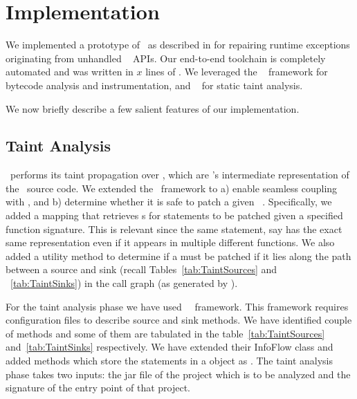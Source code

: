\section{Implementation}
\label{sec:implementation}

We implemented a prototype of \tool\ as described in  for
repairing runtime exceptions originating from unhandled \java\ 
APIs. Our end-to-end toolchain is completely automated and was written in $x$
lines of \java. We leveraged the \soot~\cite{} framework for bytecode analysis
and instrumentation, and \infoflow~\cite{} for static taint analysis.


We now briefly describe a few salient features of our implementation.

\subsection{Taint Analysis}

\infoflow\ performs its taint propagation over , which are \soot's
intermediate representation of the \java\ source code. We extended the
\infoflow\ framework to a) enable seamless coupling with \soot, and b) determine
whether it is safe to patch a given \soot\ . Specifically, we added
a mapping that retrieves s for statements to be patched given a
specified function signature. This is relevant since the same statement, say
 has the exact same representation even if it appears in
multiple different functions. We also added a utility method to determine if a
 must be patched if it lies along the path between a source and sink
(recall Tables~\ref{tab:TaintSources} and ~\ref{tab:TaintSinks}) in the call
graph (as generated by \soot).

 For the taint analysis phase we have used \soot\ \infoflow\ framework. This
 framework requires configuration files to describe source and sink methods. We
 have identified couple of methods and some of them are tabulated in the
 table~\ref{tab:TaintSources} and~\ref{tab:TaintSinks} respectively. We have
 extended their InfoFlow class and added methods which store the statements in a
  object as . The taint analysis phase takes two
inputs: the jar file of the project which is to be analyzed and the
 signature of the entry point of that project.

